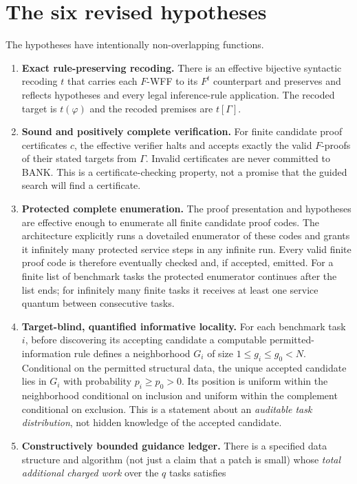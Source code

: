 \documentclass[11pt,letterpaper]{article}
\theoremstyle{definition}
\theoremstyle{remark}
\begin{document}
\section{The six revised hypotheses}
The hypotheses have intentionally non-overlapping functions.
\begin{enumerate}[leftmargin=2.7em,label=\textbf{H\arabic*.},itemsep=0.65em]
 \item \textbf{Exact rule-preserving recoding.} There is an effective bijective syntactic recoding $t$ that carries each $F$-WFF to its $F^t$ counterpart and preserves and reflects hypotheses and every legal inference-rule application. The recoded target is $t(\varphi)$ and the recoded premises are $t[\Gamma]$.
 \item \textbf{Sound and positively complete verification.} For finite candidate proof certificates $c$, the effective verifier halts and accepts exactly the valid $F$-proofs of their stated targets from $\Gamma$. Invalid certificates are never committed to BANK. This is a certificate-checking property, not a promise that the guided search will find a certificate.
 \item \textbf{Protected complete enumeration.} The proof presentation and hypotheses are effective enough to enumerate all finite candidate proof codes. The architecture explicitly runs a dovetailed enumerator of these codes and grants it infinitely many protected service steps in any infinite run. Every valid finite proof code is therefore eventually checked and, if accepted, emitted. For a finite list of benchmark tasks the protected enumerator continues after the list ends; for infinitely many finite tasks it receives at least one service quantum between consecutive tasks.
 \item \textbf{Target-blind, quantified informative locality.} For each benchmark task $i$, before discovering its accepting candidate a computable permitted-information rule defines a neighborhood $G_i$ of size $1\le g_i\le g_0<N$. Conditional on the permitted structural data, the unique accepted candidate lies in $G_i$ with probability $p_i\ge p_0>0$. Its position is uniform within the neighborhood conditional on inclusion and uniform within the complement conditional on exclusion. This is a statement about an \emph{auditable task distribution}, not hidden knowledge of the accepted candidate.
 \item \textbf{Constructively bounded guidance ledger.} There is a specified data structure and algorithm (not just a claim that a patch is small) whose \emph{total additional charged work} over the $q$ tasks satisfies

\end{enumerate}
\end{document}
